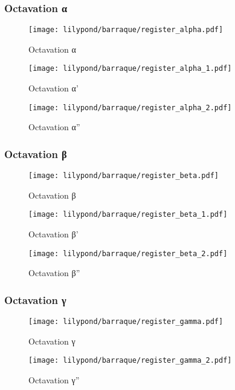 \subsubsection{Octavation α}

\begin{figure}[H]
    \texttt{[image: lilypond/barraque/register\_alpha.pdf]}
    \caption{Octavation α}
    \label{fig:register-a}
\end{figure}

\begin{figure}[H]
    \texttt{[image: lilypond/barraque/register\_alpha\_1.pdf]}
    \caption{Octavation α'}
    \label{fig:register-a-1}
\end{figure}

\begin{figure}[H]
    \texttt{[image: lilypond/barraque/register\_alpha\_2.pdf]}
    \caption{Octavation α''}
    \label{fig:register-a-2}
\end{figure}

\subsubsection{Octavation β}

\begin{figure}[H]
    \texttt{[image: lilypond/barraque/register\_beta.pdf]}
    \caption{Octavation β}
    \label{fig:register-b}
\end{figure}

\begin{figure}[H]
    \texttt{[image: lilypond/barraque/register\_beta\_1.pdf]}
    \caption{Octavation β'}
    \label{fig:register-b-1}
\end{figure}

\begin{figure}[H]
    \texttt{[image: lilypond/barraque/register\_beta\_2.pdf]}
    \caption{Octavation β''}
    \label{fig:register-b-2}
\end{figure}

\subsubsection{Octavation γ}

\begin{figure}[H]
    \texttt{[image: lilypond/barraque/register\_gamma.pdf]}
    \caption{Octavation γ}
    \label{fig:register-g}
\end{figure}

\begin{figure}[H]
    \texttt{[image: lilypond/barraque/register\_gamma\_2.pdf]}
    \caption{Octavation γ''}
    \label{fig:register-g-2}
\end{figure}

